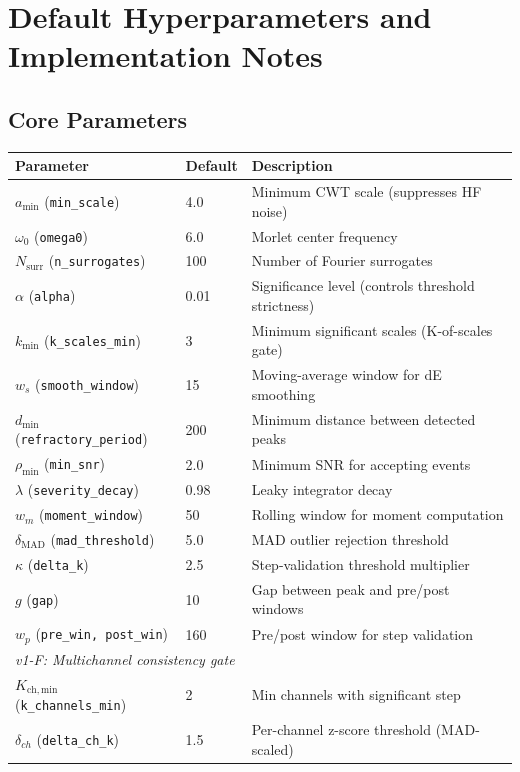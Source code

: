 \documentclass{article}
\begin{document}
\section{Default Hyperparameters and Implementation Notes}

\subsection{Core Parameters}

\begin{center}
\begin{tabular}{lll}
\toprule
\textbf{Parameter} & \textbf{Default} & \textbf{Description} \\
\midrule
$a_{\min}$ (\texttt{min\_scale}) & 4.0 & Minimum CWT scale (suppresses HF noise) \\
$\omega_0$ (\texttt{omega0}) & 6.0 & Morlet center frequency \\
$N_{\mathrm{surr}}$ (\texttt{n\_surrogates}) & 100 & Number of Fourier surrogates \\
$\alpha$ (\texttt{alpha}) & 0.01 & Significance level (controls threshold strictness) \\
$k_{\min}$ (\texttt{k\_scales\_min}) & 3 & Minimum significant scales (K-of-scales gate) \\
$w_s$ (\texttt{smooth\_window}) & 15 & Moving-average window for dE smoothing \\
$d_{\min}$ (\texttt{refractory\_period}) & 200 & Minimum distance between detected peaks \\
$\rho_{\min}$ (\texttt{min\_snr}) & 2.0 & Minimum SNR for accepting events \\
$\lambda$ (\texttt{severity\_decay}) & 0.98 & Leaky integrator decay \\
$w_m$ (\texttt{moment\_window}) & 50 & Rolling window for moment computation \\
$\delta_{\mathrm{MAD}}$ (\texttt{mad\_threshold}) & 5.0 & MAD outlier rejection threshold \\
$\kappa$ (\texttt{delta\_k}) & 2.5 & Step-validation threshold multiplier \\
$g$ (\texttt{gap}) & 10 & Gap between peak and pre/post windows \\
$w_p$ (\texttt{pre\_win, post\_win}) & 160 & Pre/post window for step validation \\
\midrule
\multicolumn{3}{l}{\textit{v1-F: Multichannel consistency gate}} \\
$K_{\mathrm{ch,min}}$ (\texttt{k\_channels\_min}) & 2 & Min channels with significant step \\
$\delta_{ch}$ (\texttt{delta\_ch\_k}) & 1.5 & Per-channel z-score threshold (MAD-scaled) \\
\bottomrule
\end{tabular}
\end{center}
\end{document}
